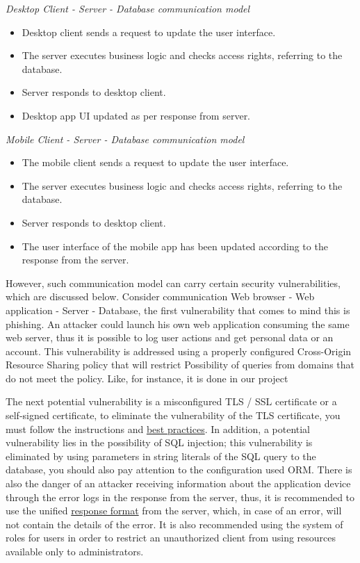 \textit{Desktop Client - Server - Database communication model}
\begin{itemize}
    \item Desktop client sends a request to update the user interface.
    \item The server executes business logic and checks access rights, referring to the database.
    \item Server responds to desktop client.
    \item Desktop app UI updated as per response from server.
\end{itemize}

\textit{Mobile Client - Server - Database communication model}
\begin{itemize}
    \item The mobile client sends a request to update the user interface.
    \item The server executes business logic and checks access rights, referring to the database.
    \item Server responds to desktop client.
    \item The user interface of the mobile app has been updated according to the response from the server.
\end{itemize}

However, such communication model can carry certain security vulnerabilities, which are discussed below.
Consider communication Web browser - Web application - Server - Database, the first vulnerability that comes to mind
this is phishing.
An attacker could launch his own web application consuming the same web server, thus
it is possible to log user actions and get personal data or an account.
This vulnerability is addressed using a properly configured Cross-Origin Resource Sharing policy that will restrict
Possibility of queries from domains that do not meet the policy.
Like, for instance, it is done in our project



The next potential vulnerability is a misconfigured TLS / SSL certificate or a self-signed certificate,
to eliminate the vulnerability of the TLS certificate, you must follow the instructions and
\href{https://www.ssl.com/guide/ssl-best-practices/}{best practices}.
In addition, a potential vulnerability lies in the possibility of SQL injection;
this vulnerability is eliminated by using
parameters in string literals of the SQL query to the database, you should also pay attention to the configuration used
ORM\@.
There is also the danger of an attacker receiving information about the application device through the error logs in the
response from the server, thus, it is recommended to use the unified \href{https://datatracker.ietf.org/doc/html/rfc7231}{response format}
from the server, which, in case of an error, will not contain the details of the error.
It is also recommended using the system of roles for users in order to restrict an unauthorized client from using
resources available only to administrators.

